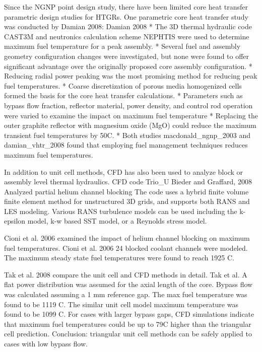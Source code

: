 Since the NGNP point design study, there have been limited core heat transfer parametric design studies for HTGRs.
One parametric core heat transfer study was conducted by Damian 2008:
Damian 2008 %
* The 3D thermal hydraulic code CAST3M and neutronics calculation scheme NEPHTIS were used to determine maximum fuel temperature for a peak assembly.
* Several fuel and assembly geometry configuration changes were investigated, but none were found to offer significant advantage over the originally proposed core assembly configuration.
* Reducing radial power peaking was the most promising method for reducing peak fuel temperatures.
* Coarse discretization of porous media homogenized cells formed the basis for the core heat transfer calculations.
* Parameters such as bypass flow fraction, reflector material, power density, and control rod operation were varied to examine the impact on maximum fuel temperature
* Replacing the outer graphite reflector with magnesium oxide (MgO) could reduce the maximum transient fuel temperatures by 50C.
* Both studies macdonald_ngnp_2003 and damian_vhtr_2008 found that employing fuel management techniques reduces maximum fuel temperatures.

In addition to unit cell methods, CFD has also been used to analyze block or assembly level thermal hydraulics.
CFD code Trio_U Bieder and Graffard, 2008 %
Analyzed partial helium channel blocking
The code uses a hybrid finite volume finite element method for unstructured 3D grids, and supports both RANS and LES modeling.
Various RANS turbulence models can be used including the k-epsilon model, k-w based SST model, or a Reynolds stress model.

Cioni et al. 2006 examined the impact of helium channel blocking on maximum fuel temperatures.
Cioni et al. 2006 %
24 blocked coolant channels were modeled.
The maximum steady state fuel temperatures were found to reach 1925 C.

Tak et al. 2008 compare the unit cell and CFD methods in detail.
Tak et al. %
A flat power distribution was assumed for the axial length of the core.
Bypass flow was calculated assuming a 1 mm reference gap.
The max fuel temperature was found to be 1119 C.
The similar unit cell model maximum temperature was found to be 1099 C.
For cases with larger bypass gaps, CFD simulations indicate that maximum fuel temperatures could be up to 79C higher than the triangular cell prediction.
Conclusion: triangular unit cell methods can be safely applied to cases with low bypass flow.

